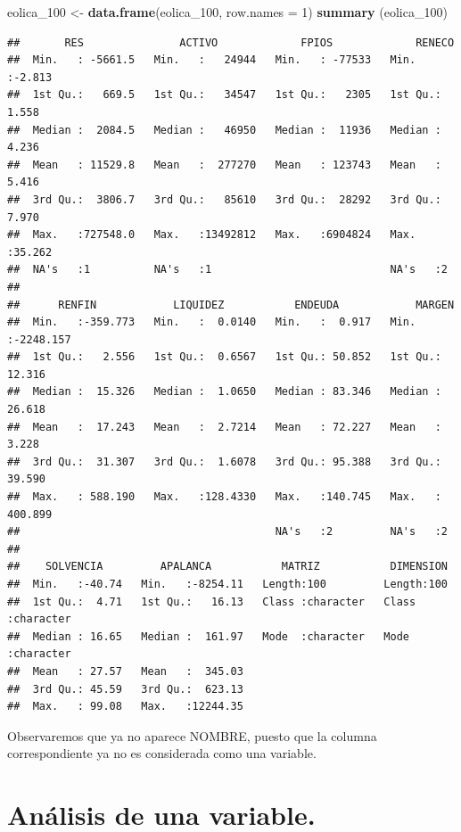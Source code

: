 \documentclass[
]{book}
\newenvironment{Shaded}{\begin{snugshade}}{\end{snugshade}}
\newcommand{\AttributeTok}[1]{\textcolor[rgb]{0.13,0.29,0.53}{#1}}
\newcommand{\DecValTok}[1]{\textcolor[rgb]{0.00,0.00,0.81}{#1}}
\newcommand{\FunctionTok}[1]{\textcolor[rgb]{0.13,0.29,0.53}{\textbf{#1}}}
\newcommand{\NormalTok}[1]{#1}
\newcommand{\OtherTok}[1]{\textcolor[rgb]{0.56,0.35,0.01}{#1}}
\begin{document}
\begin{Shaded}
\begin{Highlighting}[]
\NormalTok{eolica\_100 }\OtherTok{\textless{}{-}} \FunctionTok{data.frame}\NormalTok{(eolica\_100, }\AttributeTok{row.names =} \DecValTok{1}\NormalTok{)}
\FunctionTok{summary}\NormalTok{ (eolica\_100)}
\end{Highlighting}
\end{Shaded}

\begin{verbatim}
##       RES               ACTIVO             FPIOS             RENECO      
##  Min.   : -5661.5   Min.   :   24944   Min.   : -77533   Min.   :-2.813  
##  1st Qu.:   669.5   1st Qu.:   34547   1st Qu.:   2305   1st Qu.: 1.558  
##  Median :  2084.5   Median :   46950   Median :  11936   Median : 4.236  
##  Mean   : 11529.8   Mean   :  277270   Mean   : 123743   Mean   : 5.416  
##  3rd Qu.:  3806.7   3rd Qu.:   85610   3rd Qu.:  28292   3rd Qu.: 7.970  
##  Max.   :727548.0   Max.   :13492812   Max.   :6904824   Max.   :35.262  
##  NA's   :1          NA's   :1                            NA's   :2       
## 
##      RENFIN            LIQUIDEZ           ENDEUDA            MARGEN         
##  Min.   :-359.773   Min.   :  0.0140   Min.   :  0.917   Min.   :-2248.157  
##  1st Qu.:   2.556   1st Qu.:  0.6567   1st Qu.: 50.852   1st Qu.:   12.316  
##  Median :  15.326   Median :  1.0650   Median : 83.346   Median :   26.618  
##  Mean   :  17.243   Mean   :  2.7214   Mean   : 72.227   Mean   :    3.228  
##  3rd Qu.:  31.307   3rd Qu.:  1.6078   3rd Qu.: 95.388   3rd Qu.:   39.590  
##  Max.   : 588.190   Max.   :128.4330   Max.   :140.745   Max.   :  400.899  
##                                        NA's   :2         NA's   :2          
## 
##    SOLVENCIA         APALANCA           MATRIZ           DIMENSION        
##  Min.   :-40.74   Min.   :-8254.11   Length:100         Length:100        
##  1st Qu.:  4.71   1st Qu.:   16.13   Class :character   Class :character  
##  Median : 16.65   Median :  161.97   Mode  :character   Mode  :character  
##  Mean   : 27.57   Mean   :  345.03                                        
##  3rd Qu.: 45.59   3rd Qu.:  623.13                                        
##  Max.   : 99.08   Max.   :12244.35
\end{verbatim}

Observaremos que ya no aparece NOMBRE, puesto que la columna correspondiente ya no es considerada como una variable.

\section{Análisis de una variable.}\label{anuxe1lisis-de-una-variable.}
\end{document}

